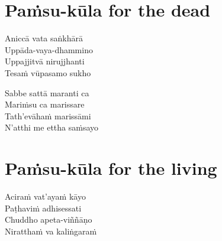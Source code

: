 \clearpage

\chapter{Paṁsu-kūla for the dead}


\begin{paritta}
Aniccā vata saṅkhārā\\
Uppāda-vaya-dhammino\\
Uppajjitvā nirujjhanti\\
Tesaṁ vūpasamo sukho

Sabbe sattā maranti ca\\
Mariṁsu ca marissare\\
Tath'evāhaṁ marissāmi\\
N'atthi me ettha saṁsayo


\end{paritta}

\chapter{Paṁsu-kūla for the living}


\begin{paritta}
Aciraṁ vat'ayaṁ kāyo\\
Paṭhaviṁ adhisessati\\
Chuddho apeta-viññāṇo\\
Niratthaṁ va kaliṅgaraṁ


\end{paritta}

